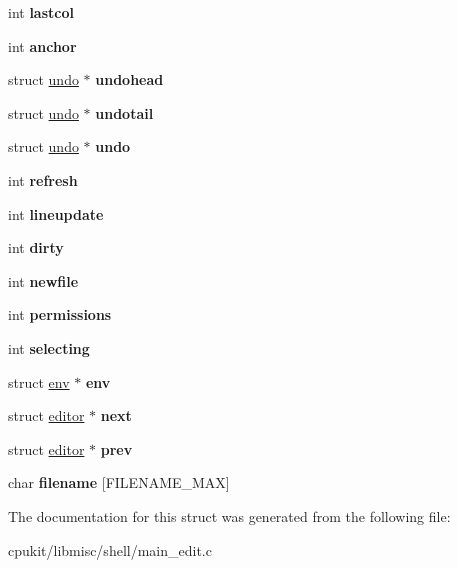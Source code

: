 \begin{DoxyCompactItemize}
int {\bfseries lastcol}
\item 
\mbox{\label{structeditor_ac1274ba666a91b571a381bcf8ceb130b}} 
int {\bfseries anchor}
\item 
\mbox{\label{structeditor_a1bb37c85728bcd6a96e43f649d5badf0}} 
struct \mbox{\hyperlink{structundo}{undo}} $\ast$ {\bfseries undohead}
\item 
\mbox{\label{structeditor_afe92875dc2b186b69b709c6d89f1928a}} 
struct \mbox{\hyperlink{structundo}{undo}} $\ast$ {\bfseries undotail}
\item 
\mbox{\label{structeditor_a8924687aa0a5aa00acf1fa2c8b1b5c2b}} 
struct \mbox{\hyperlink{structundo}{undo}} $\ast$ {\bfseries undo}
\item 
\mbox{\label{structeditor_aaf4c284cefaa85201ff596821741d14a}} 
int {\bfseries refresh}
\item 
\mbox{\label{structeditor_ab2840332e77ada4f08500a1fe7b7c1fb}} 
int {\bfseries lineupdate}
\item 
\mbox{\label{structeditor_ad241ade4c3e7460946a2b561f9a5c3a4}} 
int {\bfseries dirty}
\item 
\mbox{\label{structeditor_a6f4ded5e9abe0d5daf8a452e1240af58}} 
int {\bfseries newfile}
\item 
\mbox{\label{structeditor_a904b81947e8d9da89082065994fbdef2}} 
int {\bfseries permissions}
\item 
\mbox{\label{structeditor_a31509a139bb61d42a9c1b16d74f91c59}} 
int {\bfseries selecting}
\item 
\mbox{\label{structeditor_a7a202fb71357f22d357509a2c75489a6}} 
struct \mbox{\hyperlink{structenv}{env}} $\ast$ {\bfseries env}
\item 
\mbox{\label{structeditor_af91c9d6421eb9600599508996d527182}} 
struct \mbox{\hyperlink{structeditor}{editor}} $\ast$ {\bfseries next}
\item 
\mbox{\label{structeditor_a80a3f10f9e9ba081e4524f8f6b5f6aed}} 
struct \mbox{\hyperlink{structeditor}{editor}} $\ast$ {\bfseries prev}
\item 
\mbox{\label{structeditor_aa81636ea31aa1f6222c9df37f7400872}} 
char {\bfseries filename} \mbox{[}F\+I\+L\+E\+N\+A\+M\+E\+\_\+\+M\+AX\mbox{]}
\end{DoxyCompactItemize}


The documentation for this struct was generated from the following file\+:\begin{DoxyCompactItemize}
\item 
cpukit/libmisc/shell/main\+\_\+edit.\+c\end{DoxyCompactItemize}
